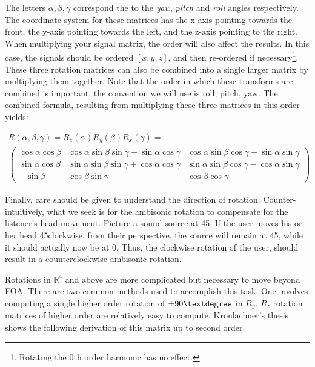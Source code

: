 The letters $\alpha, \beta, \gamma$ correspond the to the \textit{yaw}, \textit{pitch} and \textit{roll} angles respectively. The coordinate system for these matrices has the x-axis pointing towards the front, the y-axis pointing towards the left, and the z-axis pointing to the right. When multiplying your signal matrix, the order will also affect the results. In this case, the signals should be ordered $[x, y, z]$, and then re-ordered if necessary\footnote{Rotating the 0th order harmonic has no effect.}. These three rotation matrices can also be combined into a single larger matrix by multiplying them together. Note that the order in which these transforms are combined is important, the convention we will use is roll, pitch, yaw. The combined formula, resulting from multiplying these three matrices in this order yields:

\begin{equation}
\begin{array}{l}
R(\alpha, \beta, \gamma)=R_{z}(\alpha) R_{y}(\beta) R_{x}(\gamma)= \\
\left(\begin{array}{ccc}
\cos \alpha \cos \beta & \cos \alpha \sin \beta \sin \gamma-\sin \alpha \cos \gamma & \cos \alpha \sin \beta \cos \gamma+\sin \alpha \sin \gamma \\
\sin \alpha \cos \beta & \sin \alpha \sin \beta \sin \gamma+\cos \alpha \cos \gamma & \sin \alpha \sin \beta \cos \gamma-\cos \alpha \sin \gamma \\
-\sin \beta & \cos \beta \sin \gamma & \cos \beta \cos \gamma
\end{array}\right)
\end{array}
\end{equation}

Finally, care should be given to understand the direction of rotation. Counter-intuitively, what we seek is for the ambisonic rotation to compensate for the listener's head movement. Picture a sound source at 45\textdegree. If the user moves his or her head 45\textdegree clockwise, from their perspective, the source will remain at 45\textdegree, while it should actually now be at 0\textdegree. Thus, the clockwise rotation of the user, should result in a counterclockwise ambisonic rotation. 

Rotations in $\mathbb{R}^{4}$ and above are more complicated but necessary to move beyond FOA. There are two common methods used to accomplish this task. One involves computing a single higher order rotation of $\pm90\textdegree$ in $R_{y}$. $R_{z}$ rotation matrices of higher order are relatively easy to compute. Kronlachner's thesis shows the following derivation of this matrix up to second order.

